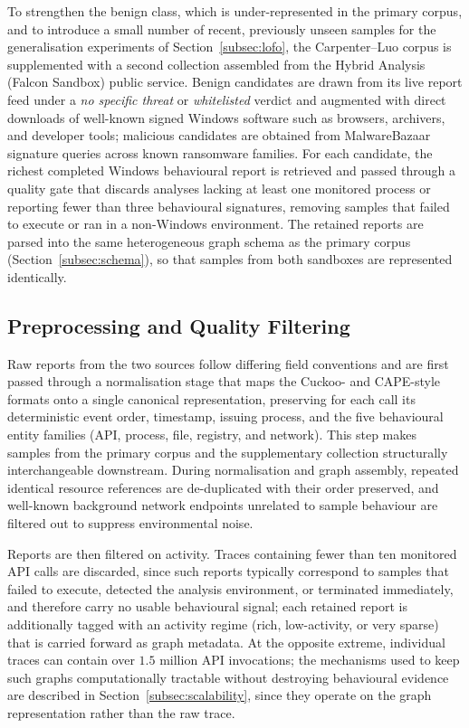 \documentclass[%
    BCOR=10mm,
    DIV=13,
    toc=bibliography,
    toc=listof,
    oneside,
    12pt,
]{scrbook}
\begin{document}
To strengthen the benign class, which is under-represented in the primary
corpus, and to introduce a small number of recent, previously unseen samples
for the generalisation experiments of Section~\ref{subsec:lofo}, the
Carpenter--Luo corpus is supplemented with a
second collection assembled from the Hybrid Analysis (Falcon Sandbox) public
service. Benign candidates are drawn from its live report feed under a
\emph{no specific threat} or \emph{whitelisted} verdict and augmented with
direct downloads of well-known signed Windows software such as browsers,
archivers, and developer tools; malicious candidates are obtained from
MalwareBazaar signature queries across known ransomware families. For each
candidate, the richest completed Windows behavioural report is retrieved and
passed through a quality gate that discards analyses lacking at least one
monitored process or reporting fewer than three behavioural signatures, removing
samples that failed to execute or ran in a non-Windows environment. The retained reports are parsed
into the same heterogeneous graph schema as the primary corpus
(Section~\ref{subsec:schema}), so that samples from both sandboxes are
represented identically.

\subsection{Preprocessing and Quality Filtering}
\label{subsec:preprocessing}

Raw reports from the two sources follow differing field conventions and are
first passed through a normalisation stage that maps the Cuckoo- and CAPE-style
formats onto a single canonical representation, preserving for each call its
deterministic event order, timestamp, issuing process, and the five
behavioural entity families (API, process, file, registry, and network). This step makes samples from the primary corpus and
the supplementary collection structurally interchangeable downstream. During
normalisation and graph assembly, repeated identical resource references are
de-duplicated with their order preserved, and well-known background network
endpoints unrelated to sample behaviour are filtered out to suppress
environmental noise.

Reports are then filtered on activity. Traces containing fewer than ten
monitored API calls are discarded, since such reports typically correspond to
samples that failed to execute, detected the analysis environment, or
terminated immediately, and therefore carry no usable behavioural signal; each
retained report is additionally tagged with an activity regime (rich,
low-activity, or very sparse) that is carried forward as graph metadata. At the opposite extreme,
individual traces can contain over $1.5$ million API invocations; the
mechanisms used to keep such graphs computationally tractable without
destroying behavioural evidence are described in
Section~\ref{subsec:scalability}, since they operate on the graph
representation rather than the raw trace.
\end{document}
